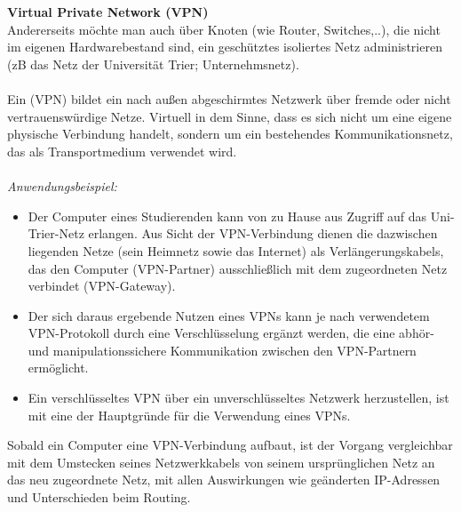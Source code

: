 ~\\~\\
\textbf{Virtual Private Network (VPN)}\\
Andererseits möchte man auch über Knoten (wie Router, Switches,..), die nicht im eigenen Hardwarebestand sind, ein geschütztes isoliertes Netz administrieren (zB das Netz der Universität Trier; Unternehmsnetz).\\~\\ Ein  (VPN) bildet ein nach außen abgeschirmtes Netzwerk über fremde oder nicht vertrauenswürdige Netze. Virtuell in dem Sinne, dass es sich nicht um eine eigene physische Verbindung handelt, sondern um ein bestehendes Kommunikationsnetz, das als Transportmedium verwendet wird.\\
~\\
\textit{Anwendungsbeispiel:}
\begin{itemize}
	\item Der Computer eines Studierenden kann von zu Hause aus Zugriff auf das Uni-Trier-Netz erlangen. Aus Sicht der VPN-Verbindung dienen die dazwischen liegenden Netze (sein Heimnetz sowie das Internet) als Verlängerungskabels, das den Computer (VPN-Partner) ausschließlich mit dem zugeordneten Netz verbindet (VPN-Gateway).
\item Der sich daraus ergebende Nutzen eines VPNs kann je nach verwendetem VPN-Protokoll durch eine Verschlüsselung ergänzt werden, die eine abhör- und manipulationssichere Kommunikation zwischen den VPN-Partnern ermöglicht.
\item Ein verschlüsseltes VPN über ein unverschlüsseltes Netzwerk herzustellen, ist mit eine der Hauptgründe für die Verwendung eines VPNs.
\end{itemize}
Sobald ein Computer eine VPN-Verbindung aufbaut, ist der Vorgang vergleichbar mit dem Umstecken seines Netzwerkkabels von seinem ursprünglichen Netz an das neu zugeordnete Netz, mit allen Auswirkungen wie geänderten IP-Adressen und Unterschieden beim Routing.


